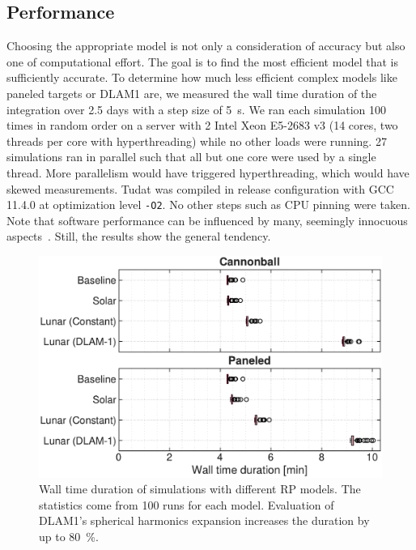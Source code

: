 







\subsection{Performance}
Choosing the appropriate model is not only a consideration of accuracy but also one of computational effort. The goal is to find the most efficient model that is sufficiently accurate. To determine how much less efficient complex models like paneled targets or \gls{DLAM1} are, we measured the wall time duration of the integration over 2.5 days with a step size of \qty{5}{\s}. We ran each simulation 100 times in random order on a server with 2 Intel Xeon E5-2683 v3 (14 cores, two threads per core with hyperthreading) while no other loads were running. 27 simulations ran in parallel such that all but one core were used by a single thread. More parallelism would have triggered hyperthreading, which would have skewed measurements. \gls{Tudat} was compiled in release configuration with GCC 11.4.0 at optimization level \texttt{-O2}. No other steps such as CPU pinning were taken. Note that software performance can be influenced by many, seemingly innocuous aspects~\cite{Mytkowicz2009}. Still, the results show the general tendency.

\begin{figure}[t]
    \centering
    \includegraphics[width=\linewidth]{figures/plots/performance.pdf}
    \caption{Wall time duration of simulations with different \gls{RP} models. The statistics come from 100 runs for each model. Evaluation of \gls{DLAM1}'s spherical harmonics expansion increases the duration by up to \qty{80}{\percent}.}
    \label{fig:performance}
\end{figure}

